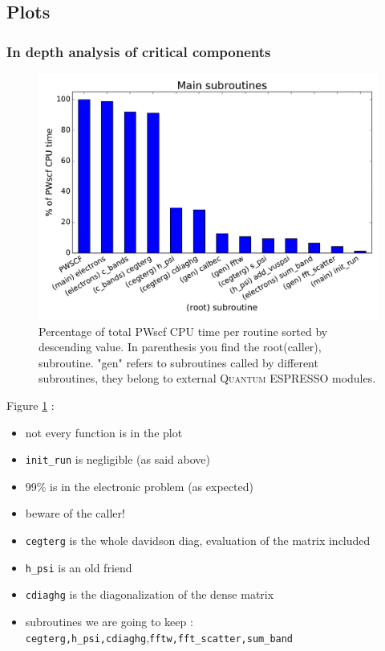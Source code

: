 \documentclass[a4paper,12pt]{article}
\newcommand\QE{\textsc{Quantum} ESPRESSO }
\begin{document}
\subsection{Plots}

\subsubsection{In depth analysis of critical components}

\begin{figure}[hhh!]
\begin{center}
	\includegraphics[width=\linewidth]{main_subroutines.pdf}	
	\caption{Percentage of total PWscf CPU time per routine sorted by descending value. 
	In parenthesis you find the root(caller), subroutine. 	
	"gen" refers to subroutines called by different subroutines, they belong to external \QE modules. }
	\label{fig:mainSubroutines}
\end{center}
\end{figure}

Figure \ref{fig:mainSubroutines} :
\begin{itemize}
	\item not every function is in the plot
 	\item \texttt{init\_run} is negligible (as said above)
 	\item 99\% is in the electronic problem (as expected)
	\item beware of the caller!
	\item \texttt{cegterg} is the whole davidson diag, evaluation of the matrix included
	\item \texttt{h\_psi} is an old friend
	\item \texttt{cdiaghg} is the diagonalization of the dense matrix
	\item subroutines we are going to keep : \texttt{cegterg,h\_psi,cdiaghg},\texttt{fftw,fft\_scatter,sum\_band}
\end{itemize}
\end{document}
